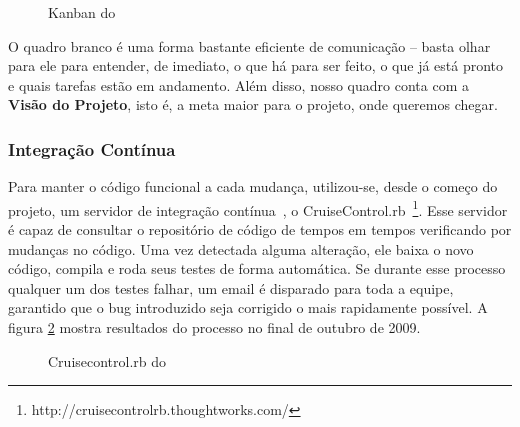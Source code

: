 \begin{figure}[H]
  \centering
  \caption{Kanban do \calopsita{}}\label{figura:kanban}
\end{figure}

O quadro branco é uma forma bastante eficiente de comunicação -- basta olhar para ele para entender, de imediato, o que há para ser feito, o que já está pronto e quais tarefas estão em andamento. Além disso, nosso quadro conta com a \textbf{Visão do Projeto}, isto é, a meta maior para o projeto, onde queremos chegar.

\subsubsection*{Integração Contínua}

Para manter o código funcional a cada mudança, utilizou-se, desde o começo do projeto, um servidor de integração contínua~\cite{ci}, o CruiseControl.rb~\footnote{http://cruisecontrolrb.thoughtworks.com/}. Esse servidor é capaz de consultar o repositório de código de tempos em tempos verificando por mudanças no código. Uma vez detectada alguma alteração, ele baixa o novo código, compila e roda seus testes de forma automática. Se durante esse processo qualquer um dos testes falhar, um email é disparado para toda a equipe, garantido que o bug introduzido seja corrigido o mais rapidamente possível. A figura \ref{figura:cruisecontrol} mostra resultados do processo no final de outubro de 2009.

\begin{figure}[H]
  \label{figura:cruisecontrol}
  \centering
  \caption{Cruisecontrol.rb do \calopsita{}}
\end{figure}

